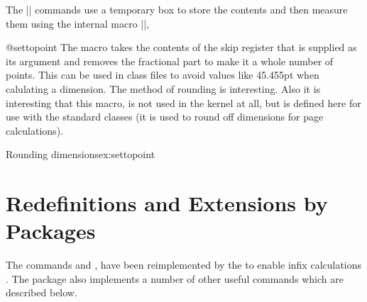 The |\setto| commands use a temporary box \CMDI{\@tempboxa} to store the contents and then 
measure them using the internal macro |\@settodim|,

\medskip
{}
\begin{teX}
  \def\@settodim#1#2#3{\setbox\@tempboxa\hbox{{#3}}#2#1\@tempboxa
        \setbox\@tempboxa\box\voidb@x}
  \def\settoheight{\@settodim\ht}
  \def\settodepth {\@settodim\dp}
  \def\settowidth {\@settodim\wd}
\end{teX}
\medskip

\begin{docCommand}{@settopoint} {}
The \CMDI{\@settopoint}
 macro takes the contents of the skip register that is supplied as its argument
and removes the fractional part to make it a whole number of points. This can be
used in class files to avoid values like 45.455pt when calulating a dimension. The method of
rounding is interesting. Also it is interesting that this macro, is not used in the kernel at all, but is defined
here for use with the standard classes (it is used to round off dimensions for page calculations).
\end{docCommand}

\begin{texexample}{Rounding dimensions}{ex:settopoint}
\bgroup 
  \makeatletter
  \def\@settopoint#1{\divide#1\p@\multiply#1\p@}
  \newlength\@test
  \setlength\@test{19.5pt}
  \@settopoint{\@test}
  \the\@test
  \makeatother
\egroup  
\end{texexample}

\section{Redefinitions and Extensions by Packages}

The commands \cmd{\settolength} and \cmd{\addtolength}, \cmd{\@settodim} have been reimplemented by the  to enable infix calculations \cite{calc}. The package also implements a number of other useful
commands which are described below. 

